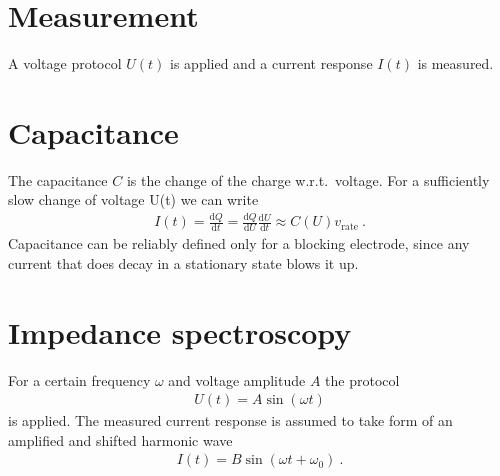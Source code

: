 \documentclass[a4 paper]{article}
\newcommand{\dd}{\mathrm{d}}
\begin{document}
\section{Measurement}
A voltage protocol $U(t)$ is applied and a current response $I(t)$ is measured.
\section{Capacitance}
% 
The capacitance $C$ is the change of the charge w.r.t.\ voltage.
For a sufficiently slow change of voltage U(t) we can write
\begin{align}
    I(t) = \frac{\dd Q}{\dd t} = \frac{\dd Q}{\dd U} \frac{\dd U}{\dd t} \approx C(U) v_{\text{rate}}~.
    \label{CAP01}
\end{align}
Capacitance can be reliably defined only for a blocking electrode, since any current that does decay in a stationary state blows it up.
\section{Impedance spectroscopy}
For a certain frequency $\omega$ and voltage amplitude $A$ the protocol
\begin{align}
    U(t) = A \sin \left( \omega t \right) 
\end{align}
is applied. The measured current response is assumed to take form of
an amplified and shifted harmonic wave
\begin{align}
    I(t) = B \sin \left( \omega t  + \omega_0 \right) ~.
\end{align}
\end{document}
